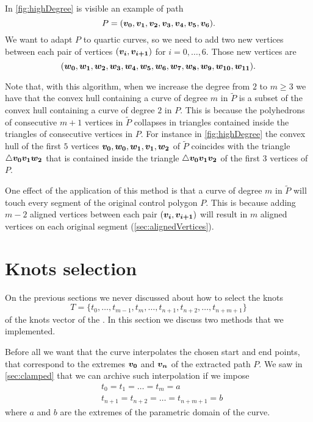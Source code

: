 \documentclass[dissertation.tex]{subfiles}
\begin{document}
In \cref{fig:highDegree} is visible an example of path
\begin{equation*}
  P=(\boldsymbol{v_0},\boldsymbol{v_1},\boldsymbol{v_2},\boldsymbol{v_3},\boldsymbol{v_4},\boldsymbol{v_5},\boldsymbol{v_6}).
\end{equation*}
We want to adapt $P$ to quartic \bs curves, so we need to add two new
vertices between each pair of vertices $(\boldsymbol{v_i},\boldsymbol{v_{i+1}})$ for
$i=0,\dots,6$. Those new vertices are
\begin{equation*}
  (\boldsymbol{w_0},\boldsymbol{w_1},\boldsymbol{w_2},\boldsymbol{w_3},\boldsymbol{w_4},\boldsymbol{w_5},\boldsymbol{w_6},\boldsymbol{w_7},\boldsymbol{w_8},\boldsymbol{w_9},\boldsymbol{w_{10}},\boldsymbol{w_{11}}).
\end{equation*}

Note that, with this algorithm, when we increase the degree from $2$
to $m\ge 3$ we have that the convex hull containing a \bs curve of
degree $m$ in
$\tilde{P}$ is a subset of the convex hull containing a \bs curve
of degree $2$
in $P$. This is because the polyhedrons of consecutive $m+1$ vertices in
$\tilde{P}$ collapses in triangles contained inside the triangles
of consecutive vertices in $P$. For instance in \cref{fig:highDegree}
the convex hull of the first $5$ vertices
$\boldsymbol{v_0},\boldsymbol{w_0},\boldsymbol{w_1},\boldsymbol{v_1},\boldsymbol{w_2}$ of $\tilde{P}$
coincides with the
triangle $\triangle \boldsymbol{v_0}\boldsymbol{v_1}\boldsymbol{w_2}$ that is contained inside
the triangle $\triangle \boldsymbol{v_0}\boldsymbol{v_1}\boldsymbol{v_2}$ of the first $3$
vertices of $P$.

One effect of the application of this method is that a curve of
degree $m$ in $\tilde{P}$ will touch
every segment of the original control polygon $P$. This is because adding
$m-2$ aligned vertices between each pair $(\boldsymbol{v_i},\boldsymbol{v_{i+1}})$
will result in $m$ aligned vertices on each original segment
(\cref{sec:alignedVertices}).

\section{Knots selection}\label{sec:knotSel}
On the previous sections we never discussed about how to select the
knots 
\begin{equation*}
  T=\{t_0,\dots,t_{m-1},t_{m},\dots,t_{n+1},t_{n+2},\dots,t_{n+m+1}\}
\end{equation*}
of the knots vector of the \bs. In this section we discuss two
methods that we implemented.

Before all we want that
the curve interpolates
the chosen start and end points, that correspond to the extremes
$\boldsymbol{v_0}$ and $\boldsymbol{v_n}$ of the extracted path $P$. We saw in
\cref{sec:clamped} that we can archive such interpolation if we impose
\begin{equation}\label{eq:externalKnotsFix}
  \begin{split}
    &t_0 = t_1 = \dots = t_{m} = a\\
    &t_{n+1} = t_{n+2} = \dots = t_{n+m+1} = b
  \end{split}
\end{equation}
where $a$ and $b$ are the extremes of the parametric domain of
the curve.
\end{document}
